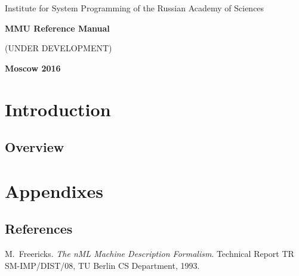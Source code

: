 \documentclass[oneside,final,14pt]{extreport}
\begin{document}
\begin{titlepage}
\begin{center}
\Large{Institute for System Programming of the Russian Academy of Sciences}

\vfill


\bf\Large{MMU Reference Manual}

(UNDER DEVELOPMENT)

\vfill

\bf
Moscow 2016
\end{center}
\end{titlepage}


\newpage
{} %
\tableofcontents


\chapter{Introduction}


\section{Overview}


\chapter{Appendixes}

\section{References}



\begin{thebibliography}{1}

M.~Freericks.
\emph{The nML Machine Description Formalism}.
Technical Report TR SM-IMP/DIST/08, TU Berlin CS Department, 1993.

\end{thebibliography}
\end{document}
